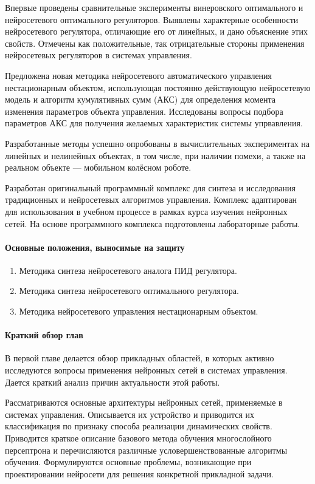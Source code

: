 Впервые проведены сравнительные эксперименты винеровского оптимального
и нейросетевого оптимального регуляторов.  Выявлены характерные
особенности нейросетевого регулятора, отличающие его от линейных, и
дано объяснение этих свойств.  Отмечены как положительные, так
отрицательные стороны применения нейросетевых регуляторов в системах
управления.

Предложена новая методика нейросетевого автоматического управления
нестационарным объектом, использующая постоянно действующую
нейросетевую модель и алгоритм кумулятивных сумм (АКС) для определения
момента изменения параметров объекта управления.  Исследованы вопросы
подбора параметров АКС для получения желаемых характеристик системы
упрвавления.

Разработанные методы успешно опробованы в вычислительных экспериментах
на линейных и нелинейных объектах, в том числе, при наличии помехи, а
также на реальном объекте --- мобильном колёсном роботе.

Разработан оригинальный программный комплекс для синтеза и
исследования традиционных и нейросетевых алгоритмов управления.
Комплекс адаптирован для использования в учебном процессе в рамках
курса изучения нейронных сетей.  На основе программного комплекса
подготовлены лабораторные работы.

\paragraph{Основные положения, выносимые на защиту}

\begin{enumerate}
\item Методика синтеза нейросетевого аналога ПИД регулятора.
\item Методика синтеза нейросетевого оптимального регулятора.
\item Методика нейросетевого управления нестационарным объектом.
\end{enumerate}

\paragraph{Краткий обзор глав}

В первой главе делается обзор прикладных областей, в которых активно
исследуются вопросы применения нейронных сетей в системах управления.
Дается краткий анализ причин актуальности этой работы.

Рассматриваются основные архитектуры нейронных сетей, применяемые в
системах управления.  Описывается их устройство и приводится их
классификация по признаку способа реализации динамических свойств.
Приводится краткое описание базового метода обучения многослойного
персептрона и перечисляются различные условершенствованные алгоритмы
обучения.  Формулируются основные проблемы, возникающие при
проектировании нейросети для решения конкретной прикладной задачи.

